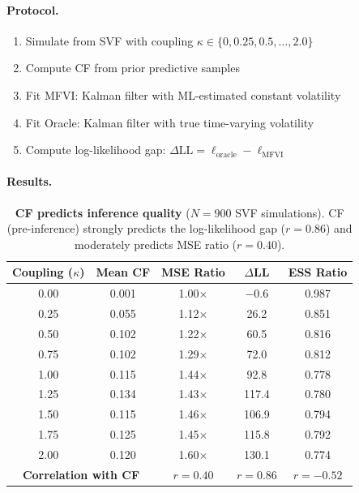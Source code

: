 \documentclass[10pt]{article} %
\theoremstyle{plain}
\theoremstyle{definition}
\begin{document}
\paragraph{Protocol.}
\begin{enumerate}[nosep]
    \item Simulate from SVF with coupling $\kappa \in \{0, 0.25, 0.5, \ldots, 2.0\}$
    \item Compute CF from prior predictive samples
    \item Fit MFVI: Kalman filter with ML-estimated constant volatility
    \item Fit Oracle: Kalman filter with true time-varying volatility
    \item Compute log-likelihood gap: $\Delta\text{LL} = \ell_{\text{oracle}} - \ell_{\text{MFVI}}$
\end{enumerate}

\paragraph{Results.}

\begin{table}[!htbp]
\centering
\caption{\textbf{CF predicts inference quality} ($N = 900$ SVF simulations). CF (pre-inference) strongly predicts the log-likelihood gap ($r = 0.86$) and moderately predicts MSE ratio ($r = 0.40$).}
\label{tab:cf-ll-validation}
\begin{tabular}{ccccc}
\toprule
Coupling ($\kappa$) & Mean CF & MSE Ratio & $\Delta$LL & ESS Ratio \\
\midrule
0.00 & 0.001 & 1.00$\times$ & $-0.6$ & 0.987 \\
0.25 & 0.055 & 1.12$\times$ & 26.2 & 0.851 \\
0.50 & 0.102 & 1.22$\times$ & 60.5 & 0.816 \\
0.75 & 0.102 & 1.29$\times$ & 72.0 & 0.812 \\
1.00 & 0.115 & 1.44$\times$ & 92.8 & 0.778 \\
1.25 & 0.134 & 1.43$\times$ & 117.4 & 0.780 \\
1.50 & 0.115 & 1.46$\times$ & 106.9 & 0.794 \\
1.75 & 0.125 & 1.45$\times$ & 115.8 & 0.792 \\
2.00 & 0.120 & 1.60$\times$ & 130.1 & 0.774 \\
\midrule
\multicolumn{2}{c}{\textbf{Correlation with CF}} & $r = 0.40$ & $r = 0.86$ & $r = -0.52$ \\
\bottomrule
\end{tabular}
\end{table}
\end{document}
